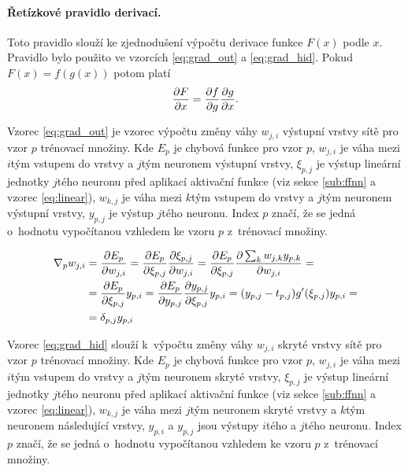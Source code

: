 \paragraph{Řetízkové pravidlo derivací.}
Toto pravidlo slouží ke zjednodušení výpočtu derivace funkce $F(x)$ podle $x$.
Pravidlo bylo použito ve vzorcích \ref{eq:grad_out} a \ref{eq:grad_hid}.
Pokud $F(x)=f(g(x))$ potom platí \begin{equation}\pdv{F}{x}=\pdv{f}{g}\pdv{g}{x}.\label{eq:chain_rule}\end{equation}

Vzorec \ref{eq:grad_out} je vzorec výpočtu změny váhy $w_{j,i}$ výstupní vrstvy sítě pro vzor $p$ trénovací množiny.
Kde $E_p$ je chybová funkce pro vzor $p$, $w_{j,i}$ je váha mezi $i$tým vstupem do vrstvy a $j$tým neuronem výstupní vrstvy, $\xi_{p,j}$ je výstup lineární jednotky $j$tého neuronu před aplikací aktivační funkce (viz sekce \ref{sub:ffnn} a vzorec \ref{eq:linear}), $w_{k,j}$ je váha mezi $k$tým vstupem do vrstvy a $j$tým neuronem výstupní vrstvy, $y_{p,j}$ je výstup $j$tého neuronu.
Index $p$ značí, že se jedná o~hodnotu vypočítanou vzhledem ke vzoru $p$ z~trénovací množiny.

\begin{align}
\nabla_{p}w_{j,i}&=\pdv{E_p}{w_{j,i}}=\pdv{E_p}{\xi_{p,j}}\pdv{\xi_{p,j}}{w_{j,i}}=\pdv{E_p}{\xi_{p,j}}\pdv{\sum_k{w_{j,k}y_{p,k}}}{w_{j,i}}=\nonumber\\
&=\pdv{E_p}{\xi_{p,j}}y_{p,i}=\pdv{E_p}{y_{p,j}}\pdv{y_{p,j}}{\xi_{p,j}}y_{p,i}=(y_{p,j}-t_{p,j})g'(\xi_{p,j})y_{p,i}=\nonumber\\
&=\delta_{p,j}y_{p,i}
\label{eq:grad_out}
\end{align}

Vzorec \ref{eq:grad_hid} slouží k~výpočtu změny váhy $w_{j,i}$ skryté vrstvy sítě pro vzor $p$ trénovací množiny.
Kde $E_p$ je chybová funkce pro vzor $p$, $w_{j,i}$ je váha mezi $i$tým vstupem do vrstvy a $j$tým neuronem skryté vrstvy, $\xi_{p,j}$ je výstup lineární jednotky $j$tého neuronu před aplikací aktivační funkce (viz sekce \ref{sub:ffnn} a vzorec \ref{eq:linear}), $w_{k,j}$ je váha mezi $j$tým neuronem skryté vrstvy a $k$tým neuronem následující vrstvy, $y_{p,i}$ a $y_{p,j}$ jsou výstupy $i$tého a $j$tého neuronu.
Index $p$ značí, že se jedná o~hodnotu vypočítanou vzhledem ke vzoru $p$ z~trénovací množiny.


